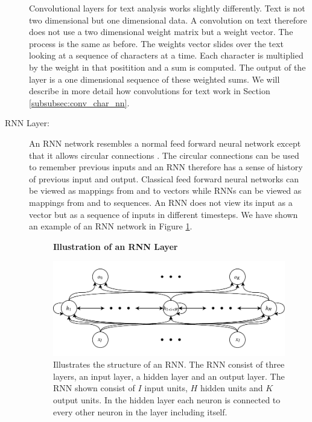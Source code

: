 \begin{description}
        Convolutional layers for text analysis works slightly differently.
        Text is not two dimensional but one dimensional data. A convolution
        on text therefore does not use a two dimensional weight matrix but a
        weight vector. The process is the same as before. The weights vector
        slides over the text looking at a sequence of characters at a time. Each
        character is multiplied by the weight in that positition and a sum is
        computed. The output of the layer is a one dimensional sequence of these
        weighted sums. We will describe in more detail how convolutions for text
        work in Section \ref{subsubsec:conv_char_nn}.

    \item[\gls{RNN} Layer:]

        An \gls{RNN} network resembles a normal feed forward
        neural network except that it allows circular connections
        \citep{DBLP:series/sci/2012-385}. The circular connections can be used
        to remember previous inputs and an \gls{RNN} therefore has a sense of
        history of previous input and output. Classical feed forward neural
        networks can be viewed as mappings from and to vectors while \glspl{RNN}
        can be viewed as mappings from and to sequences. An \gls{RNN} does not
        view its input as a vector but as a sequence of inputs in different
        timesteps. We have shown an example of an \gls{RNN} network in Figure
        \ref{fig:rnn_illustration}.

        \begin{figure}
            \centering
            \textbf{Illustration of an \gls{RNN} Layer}\par\medskip
            \includegraphics[width=\textwidth]{./pictures/method/RNN}
            \caption{Illustrates the structure of an \gls{RNN}. The \gls{RNN}
                consist of three layers, an input layer, a hidden layer and an
                output layer. The \gls{RNN} shown consist of $I$ input units,
                $H$ hidden units and $K$ output units. In the hidden layer each
                neuron is connected to every other neuron in the layer including
                itself.}
            \label{fig:rnn_illustration}
        \end{figure}


\end{description}

